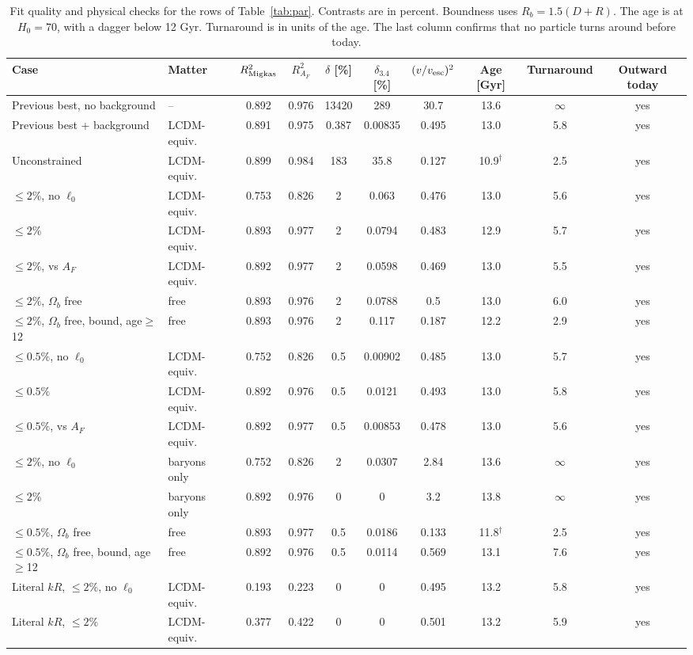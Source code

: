 \documentclass[10pt,letterpaper]{article}
\begin{document}
\begin{table}[H]\centering\scriptsize\setlength{\tabcolsep}{3pt}
\caption{Fit quality and physical checks for the rows of Table~\ref{tab:par}. Contrasts are in percent. Boundness uses $R_b=1.5(D+R)$. The age is at $H_0=70$, with a dagger below 12 Gyr. Turnaround is in units of the age. The last column confirms that no particle turns around before today.}\label{tab:diag}
\begin{tabular}{llcccccccc}\toprule
Case & Matter & $R^2_{\rm Migkas}$ & $R^2_{A_F}$ & $\delta$ [\%] & $\delta_{3.4}$ [\%] & $(v/v_{\rm esc})^2$ & Age [Gyr] & Turnaround & Outward today\\\midrule
Previous best, no background & -- & 0.892 & 0.976 & 13420 & 289 & 30.7 & 13.6 & $\infty$ & yes\\
Previous best + background & LCDM-equiv. & 0.891 & 0.975 & 0.387 & 0.00835 & 0.495 & 13.0 & 5.8 & yes\\
Unconstrained & LCDM-equiv. & 0.899 & 0.984 & 183 & 35.8 & 0.127 & 10.9$^\dagger$ & 2.5 & yes\\
$\le2\%$, no $\ell_0$ & LCDM-equiv. & 0.753 & 0.826 & 2 & 0.063 & 0.476 & 13.0 & 5.6 & yes\\
$\le2\%$ & LCDM-equiv. & 0.893 & 0.977 & 2 & 0.0794 & 0.483 & 12.9 & 5.7 & yes\\
$\le2\%$, vs $A_F$ & LCDM-equiv. & 0.892 & 0.977 & 2 & 0.0598 & 0.469 & 13.0 & 5.5 & yes\\
$\le2\%$, $\Omega_b$ free & free & 0.893 & 0.976 & 2 & 0.0788 & 0.5 & 13.0 & 6.0 & yes\\
$\le2\%$, $\Omega_b$ free, bound, age$\ge$12 & free & 0.893 & 0.976 & 2 & 0.117 & 0.187 & 12.2 & 2.9 & yes\\
$\le0.5\%$, no $\ell_0$ & LCDM-equiv. & 0.752 & 0.826 & 0.5 & 0.00902 & 0.485 & 13.0 & 5.7 & yes\\
$\le0.5\%$ & LCDM-equiv. & 0.892 & 0.976 & 0.5 & 0.0121 & 0.493 & 13.0 & 5.8 & yes\\
$\le0.5\%$, vs $A_F$ & LCDM-equiv. & 0.892 & 0.977 & 0.5 & 0.00853 & 0.478 & 13.0 & 5.6 & yes\\
$\le2\%$, no $\ell_0$ & baryons only & 0.752 & 0.826 & 2 & 0.0307 & 2.84 & 13.6 & $\infty$ & yes\\
$\le2\%$ & baryons only & 0.892 & 0.976 & 0 & 0 & 3.2 & 13.8 & $\infty$ & yes\\
$\le0.5\%$, $\Omega_b$ free & free & 0.893 & 0.977 & 0.5 & 0.0186 & 0.133 & 11.8$^\dagger$ & 2.5 & yes\\
$\le0.5\%$, $\Omega_b$ free, bound, age$\ge$12 & free & 0.892 & 0.976 & 0.5 & 0.0114 & 0.569 & 13.1 & 7.6 & yes\\
Literal $kR$, $\le2\%$, no $\ell_0$ & LCDM-equiv. & 0.193 & 0.223 & 0 & 0 & 0.495 & 13.2 & 5.8 & yes\\
Literal $kR$, $\le2\%$ & LCDM-equiv. & 0.377 & 0.422 & 0 & 0 & 0.501 & 13.2 & 5.9 & yes\\
\bottomrule\end{tabular}\end{table}
\end{document}
